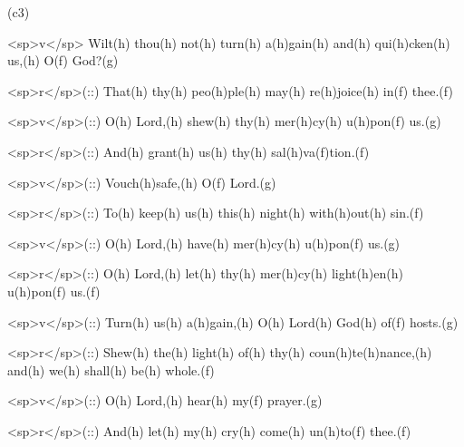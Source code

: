 (c3)

<sp>v</sp> Wilt(h) thou(h) not(h) turn(h) a(h)gain(h) and(h) qui(h)cken(h) us,(h) O(f) God?(g)

<sp>r</sp>(::) That(h) thy(h) peo(h)ple(h) may(h) re(h)joice(h) in(f) thee.(f)

<sp>v</sp>(::) O(h) Lord,(h) shew(h) thy(h) mer(h)cy(h) u(h)pon(f) us.(g)

<sp>r</sp>(::) And(h) grant(h) us(h) thy(h) sal(h)va(f)tion.(f)

<sp>v</sp>(::) Vouch(h)safe,(h) O(f) Lord.(g)

<sp>r</sp>(::) To(h) keep(h) us(h) this(h) night(h) with(h)out(h) sin.(f)

<sp>v</sp>(::) O(h) Lord,(h) have(h) mer(h)cy(h) u(h)pon(f) us.(g)

<sp>r</sp>(::) O(h) Lord,(h) let(h) thy(h) mer(h)cy(h) light(h)en(h) u(h)pon(f) us.(f)

<sp>v</sp>(::) Turn(h) us(h) a(h)gain,(h) O(h) Lord(h) God(h) of(f) hosts.(g)

<sp>r</sp>(::) Shew(h) the(h) light(h) of(h) thy(h) coun(h)te(h)nance,(h) and(h) we(h) shall(h) be(h) whole.(f)

<sp>v</sp>(::) O(h) Lord,(h) hear(h) my(f) prayer.(g)

<sp>r</sp>(::) And(h) let(h) my(h) cry(h) come(h) un(h)to(f) thee.(f)